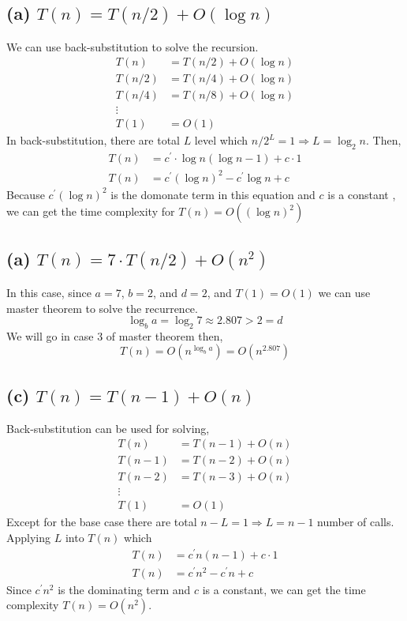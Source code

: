\documentclass{article}
\begin{document}
\subsection*{(a) $T(n) = T(n/2) + O(\log n)$}
We can use back-substitution to solve the recursion.
    \begin{align}
        T(n) & = T(n/2) + O(\log n) \nonumber \\
        T(n/2) & = T(n/4) +  O(\log n) \nonumber \\
        T(n/4) &= T(n/8) + O(\log n) \nonumber \\
        \vdots \nonumber \\
        T(1) &= O(1) \nonumber
    \end{align}
In back-substitution, there are total $L$ level which $n/2^L = 1 \Rightarrow L = \log_2 n$.
Then, 
    \begin{align}
        T(n) &= c^\prime \cdot \log n (\log n - 1) + c \cdot 1 \nonumber \\
        T(n) &= c^\prime (\log n)^2 - c^\prime \log n + c \nonumber 
    \end{align}
    Because $c^\prime  (\log n)^2$ is the domonate term in this equation and $c$ is a constant
    , we can get the time complexity for $T(n) = O((\log n)^2)$

\subsection*{(a) $T(n) = 7\cdot T(n/2) + O(n^2)$}
In this case, since $a = 7$, $b = 2$, and $d = 2$, and $T(1) = O(1)$ we can use master theorem to solve the recurrence.
$$\log_b a = \log_2 7 \approx 2.807 > 2 = d $$
We will go in case 3 of master theorem then,
$$T(n) = O(n^{\log_b a}) = O(n^{2.807})$$

\subsection*{(c) $T(n) = T(n-1) + O(n)$}
Back-substitution can be used for solving,
    \begin{align}
        T(n) & = T(n-1) + O(n) \nonumber \\
        T(n-1) & = T(n-2) + O(n) \nonumber \\
        T(n-2) & = T(n-3) + O(n) \nonumber \\
        \vdots \nonumber \\
        T(1) &= O(1) \nonumber
    \end{align}
Except for the base case there are total  $n-L = 1 \Rightarrow L = n-1$ number of calls.
Applying $L$ into $T(n)$ which 
    \begin{align}
        T(n) &= c^\prime n (n-1) + c\cdot 1 \nonumber \\
        T(n) &= c^\prime n^2 - c^\prime  n + c \nonumber 
    \end{align}
Since $c^\prime n^2$ is the dominating term and $c$ is a constant, we can get the time complexity $T(n) = O(n^2)$.
\end{document}
